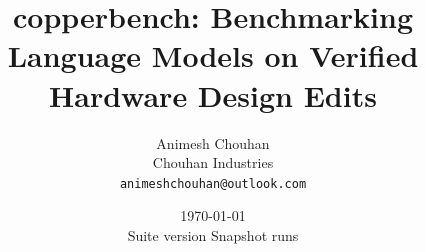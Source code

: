 \documentclass[11pt]{article}
\title{\textbf{copperbench: Benchmarking Language Models on Verified Hardware Design Edits}}
\author{
  Animesh Chouhan\\
  Chouhan Industries\\
  \texttt{animeshchouhan@outlook.com}
}
\date{\today\\[0.5em]\small Suite version \suiteVersion{} \quad Snapshot \snapshotId{} \quad \recordCount{} runs}
\begin{document}
\maketitle

\begin{abstract}

\end{abstract}
















\appendix

\end{document}

